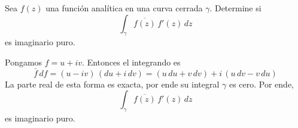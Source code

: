 \begin{exercise}
Sea $f(z)$ una función analítica en una curva cerrada $\gamma$. Determine si
$$\int_\gamma \overline {f(z)} \, f'(z) \, dz$$
es imaginario puro.
\end{exercise}

\begin{solution}
Pongamos $f = u + iv$. Entonces el integrando es
$$\bar f \, df = (u - iv) \, (du + i \, dv) = (u \, du + v \, dv) + i \, (u \, dv - v \, du)$$
La parte real de esta forma es exacta, por ende su integral $\gamma$ es cero. Por ende,
$$\int_\gamma \overline {f(z)} \, f'(z) \, dz$$
es imaginario puro.
\end{solution}
